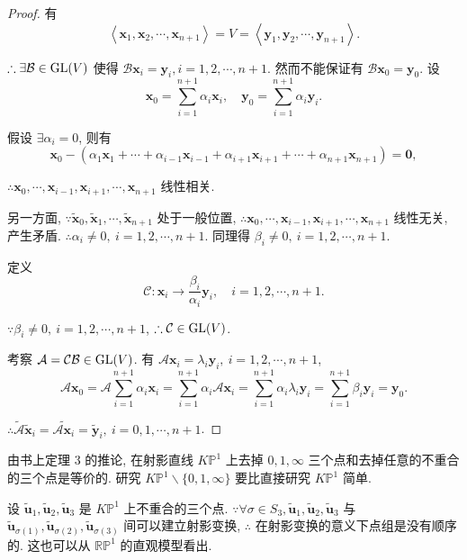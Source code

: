 \documentclass[color=black,device=normal,lang=cn,mode=geye]{elegantnote}
\begin{document}
\begin{proof}
    有
    \[\left<\boldsymbol{x}_1,\boldsymbol{x}_2,\cdots,\boldsymbol{x}_{n+1}\right>=V=\left<\boldsymbol{y}_1,\boldsymbol{y}_2,\cdots,\boldsymbol{y}_{n+1}\right>.\]

    $\therefore\exists\mathcal{B}\in\operatorname{GL} (V)$ 使得 $\mathcal{B}\boldsymbol{x}_i=\boldsymbol{y}_i,i=1,2,\cdots,n+1$. 然而不能保证有 $\mathcal{B}\boldsymbol{x}_0=\boldsymbol{y}_0$. 设
    \[\boldsymbol{x}_0=\sum\limits_{i=1}^{n+1}\alpha_i\boldsymbol{x}_i,\quad\boldsymbol{y}_0=\sum\limits_{i=1}^{n+1}\alpha_i\boldsymbol{y}_i.\]

    假设 $\exists\alpha_i=0$, 则有
    \[\boldsymbol{x}_0-(\alpha_1\boldsymbol{x}_1+\cdots+\alpha_{i-1}\boldsymbol{x}_{i-1}+\alpha_{i+1}\boldsymbol{x}_{i+1}+\cdots+\alpha_{n+1}\boldsymbol{x}_{n+1})=\boldsymbol{0},\]

    $\therefore\boldsymbol{x}_0,\cdots,\boldsymbol{x}_{i-1},\boldsymbol{x}_{i+1},\cdots,\boldsymbol{x}_{n+1}$ 线性相关.
    
    另一方面, $\because\tilde{\boldsymbol{x}}_0,\tilde{\boldsymbol{x}}_1,\cdots,\tilde{\boldsymbol{x}}_{n+1}$ 处于一般位置, $\therefore\boldsymbol{x}_0,\cdots,\boldsymbol{x}_{i-1},\boldsymbol{x}_{i+1},\cdots,\boldsymbol{x}_{n+1}$ 线性无关, 产生矛盾. $\therefore\alpha_i\neq0,\ i=1,2,\cdots,n+1$. 同理得 $\beta_i\neq0,\ i=1,2,\cdots,n+1$.
    
    定义
    \[\mathcal{C}:\boldsymbol{x}_i\to\dfrac{\beta_i}{\alpha_i}\boldsymbol{y}_i,\quad i=1,2,\cdots,n+1.\]

    $\because\beta_i\neq0,\ i=1,2,\cdots,n+1$, $\therefore\mathcal{C}\in\operatorname{GL} (V)$.

    考察 $\mathcal{A}=\mathcal{CB}\in\operatorname{GL} (V)$. 有 $\mathcal{A}\boldsymbol{x}_i=\lambda_i\boldsymbol{y}_i,\ i=1,2,\cdots,n+1$,
    \[\mathcal{A}\boldsymbol{x}_0=\mathcal{A}\sum\limits_{i=1}^{n+1}\alpha_i\boldsymbol{x}_i=\sum\limits_{i=1}^{n+1}\alpha_i\mathcal{A}\boldsymbol{x}_i=\sum\limits_{i=1}^{n+1}\alpha_i\lambda_i\boldsymbol{y}_i=\sum\limits_{i=1}^{n+1}\beta_i\boldsymbol{y}_i=\boldsymbol{y}_0.\]

    $\therefore\widetilde{\mathcal{A}}\tilde{\boldsymbol{x}}_i=\widetilde{\mathcal{A}\boldsymbol{x}_i}=\tilde{\boldsymbol{y}}_i,\ i=0,1,\cdots,n+1$.
\end{proof}
由书上定理 3 的推论, 在射影直线 $K\mathbb{P}^1$ 上去掉 $0,1,\infty$ 三个点和去掉任意的不重合的三个点是等价的. 研究 $K\mathbb{P}^1\backslash\{0,1,\infty\}$ 要比直接研究 $K\mathbb{P}^1$ 简单.

设 $\tilde{\boldsymbol{u}}_1,\tilde{\boldsymbol{u}}_2,\tilde{\boldsymbol{u}}_3$ 是 $K\mathbb{P}^1$ 上不重合的三个点. $\because\forall\sigma\in S_3,\tilde{\boldsymbol{u}}_1,\tilde{\boldsymbol{u}}_2,\tilde{\boldsymbol{u}}_3$ 与 $\tilde{\boldsymbol{u}}_{\sigma(1)},\tilde{\boldsymbol{u}}_{\sigma(2)},\tilde{\boldsymbol{u}}_{\sigma(3)}$ 间可以建立射影变换, $\therefore$ 在射影变换的意义下点组是没有顺序的. 这也可以从 $\mathbb{RP}^1$ 的直观模型看出.
\end{document}
